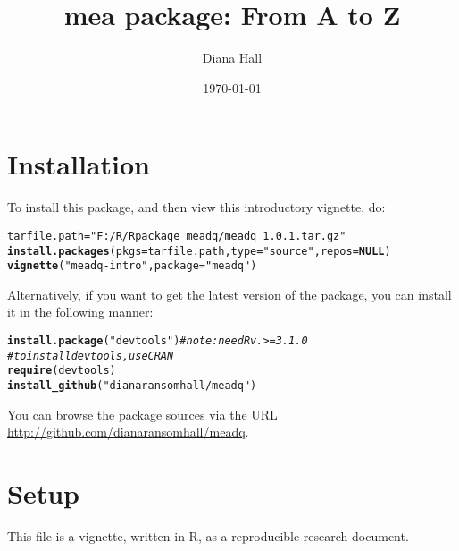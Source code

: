 \documentclass{article}\usepackage[]{graphicx}\usepackage[]{color}
\makeatletter
\newcommand{\hlstr}[1]{\textcolor[rgb]{0.192,0.494,0.8}{#1}}%
\newcommand{\hlcom}[1]{\textcolor[rgb]{0.678,0.584,0.686}{\textit{#1}}}%
\newcommand{\hlstd}[1]{\textcolor[rgb]{0.345,0.345,0.345}{#1}}%
\newcommand{\hlkwa}[1]{\textcolor[rgb]{0.161,0.373,0.58}{\textbf{#1}}}%
\newcommand{\hlkwb}[1]{\textcolor[rgb]{0.69,0.353,0.396}{#1}}%
\newcommand{\hlkwc}[1]{\textcolor[rgb]{0.333,0.667,0.333}{#1}}%
\newcommand{\hlkwd}[1]{\textcolor[rgb]{0.737,0.353,0.396}{\textbf{#1}}}%
\newenvironment{kframe}{%
 \def\at@end@of@kframe{}%
 \ifinner\ifhmode%
  \def\at@end@of@kframe{\end{minipage}}%
  \begin{minipage}{\columnwidth}%
 \fi\fi%
 \def\FrameCommand##1{\hskip\@totalleftmargin \hskip-\fboxsep
 \colorbox{shadecolor}{##1}\hskip-\fboxsep
     \hskip-\linewidth \hskip-\@totalleftmargin \hskip\columnwidth}%
 \MakeFramed {\advance\hsize-\width
   \@totalleftmargin\z@ \linewidth\hsize
   \@setminipage}}%
 {\par\unskip\endMakeFramed%
 \at@end@of@kframe}
\newenvironment{knitrout}{}{} %
\makeatother
\begin{document}
\onehalfspacing
\title{mea package: From A to Z }

\author{Diana Hall}
\date{\today}

\maketitle


\section*{Installation}
To install this package, and then view this introductory vignette, do:

\begin{knitrout}
\color{fgcolor}\begin{kframe}
\begin{alltt}
\hlstd{tarfile.path} \hlkwb{=} \hlstr{"F:/R/Rpackage_meadq/meadq_1.0.1.tar.gz"}
\hlkwd{install.packages}\hlstd{(}\hlkwc{pkgs} \hlstd{= tarfile.path,} \hlkwc{type} \hlstd{=} \hlstr{"source"}\hlstd{,} \hlkwc{repos} \hlstd{=} \hlkwa{NULL}\hlstd{)}
\hlkwd{vignette}\hlstd{(}\hlstr{"meadq-intro"}\hlstd{,} \hlkwc{package} \hlstd{=} \hlstr{"meadq"}\hlstd{)}
\end{alltt}
\end{kframe}
\end{knitrout}


Alternatively, if you want to get the latest version of the package,
you can install it in the following manner:
\begin{knitrout}
\color{fgcolor}\begin{kframe}
\begin{alltt}
\hlkwd{install.package}\hlstd{(}\hlstr{"devtools"}\hlstd{)}  \hlcom{# note: need R v.>=3.1.0}
\hlcom{# to install devtools, use CRAN}
\hlkwd{require}\hlstd{(devtools)}
\hlkwd{install_github}\hlstd{(}\hlstr{"dianaransomhall/meadq"}\hlstd{)}
\end{alltt}
\end{kframe}
\end{knitrout}

You can browse the package sources via the URL
\url{http://github.com/dianaransomhall/meadq}.


\section*{Setup}
This file is a vignette, written in R, as a reproducible research
document.
\end{document}
